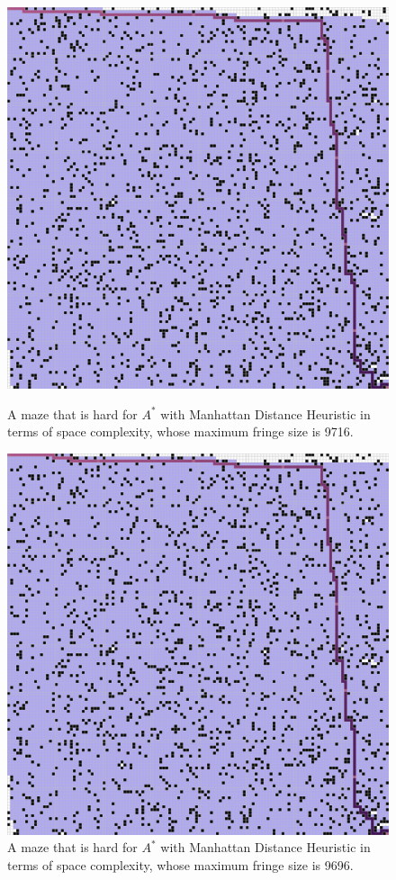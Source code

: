 \documentclass[letter]{article}
\begin{document}
\begin{enumerate}[resume]
\begin{enumerate}
\begin{enumerate}
\begin{figure}
					\includegraphics[width=\textwidth]{../pics/amf/9716.png}
					\caption{\label{fig:amf2}A maze that is hard for $ A^* $ with Manhattan Distance Heuristic in terms of space complexity, whose maximum fringe size is 9716. }
					\endminipage\hfill
					\includegraphics[width=\textwidth]{../pics/amf/9696.png}
					\caption{\label{fig:amf3} A maze that is hard for $ A^* $ with Manhattan Distance Heuristic in terms of space complexity, whose maximum fringe size is 9696. }
					\endminipage
					\endminipage 
				\end{figure}
				

\end{enumerate}
\end{enumerate}
\end{enumerate}
\end{document}
